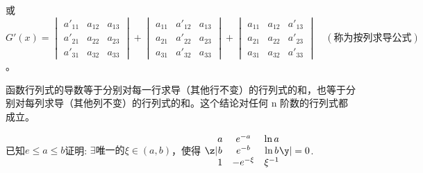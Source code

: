 或 \[G'(x)=\begin{vmatrix}a'_{11}&a_{12}&a_{13}\\a'_{21}&a_{22}&a_{23}\\a'_{31}&a_{32}&a_{33}\end{vmatrix}+\begin{vmatrix}a_{11}&a'_{12}&a_{13}\\a_{21}&a'_{22}&a_{23}\\a_{31}&a'_{32}&a_{33}\end{vmatrix}+\begin{vmatrix}a_{11}&a_{12}&a'_{13}\\a_{21}&a_{22}&a'_{23}\\a_{31}&a_{32}&a'_{33}\end{vmatrix} \quad (\text{称为按列求导公式})\]。

\begin{remark}
函数行列式的导数等于分别对每一行求导（其他行不变）的行列式的和，也等于分别对每列求导（其他列不变）的行列式的和。这个结论对任何 
n
 阶数的行列式都成立。
\end{remark}
\vspace{2mm}

\begin{example}
已知$e\le a\le b$证明: $\displaystyle \exists \text{唯一的} \xi \in (a,b) $，使得
                                $\z|\begin{matrix} 
                                   a & e^{-a}    & \ln a \\
                                   b & e^{-b}    & \ln b \\
                                   1 & -e^{-\xi} & \xi^{-1} \end{matrix} \y|=0$.
\end{example}

